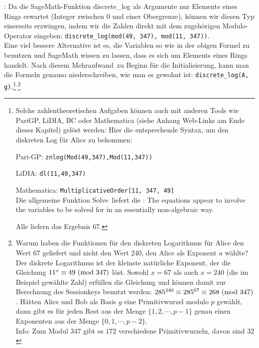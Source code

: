 \begin{refsegment}
\begin{remark}{:}
\noindent Da die SageMath-Funktion discrete\_log als Argumente nur
Elemente eines Rings erwartet (Integer zwischen 0 und einer Obergrenze),
können wir diesen Typ einerseits erzwingen, indem wir die Zahlen direkt mit dem
zugehörigen Modulo-Operator eingeben: \texttt{discrete\_log(mod(49, 347), mod(11, 347))}.\\
Eine viel bessere Alternative ist es, die Variablen so wie in der obigen Formel
zu benutzen und SageMath wissen zu lassen, dass es sich um Elements eines Rings handelt.
Nach diesem \glqq Mehraufwand\grqq~zu Beginn für die Initialisierung, kann man die Formeln
genauso niederschreiben, wie man es gewohnt ist: \texttt{discrete\_log(A, g)}.\footnote{%
Solche zahlentheoretischen Aufgaben können auch mit anderen Tools wie PariGP,
LiDIA, BC oder Mathematica
(siehe Anhang Web-Links am Ende dieses Kapitel) gelöst werden:
Hier die entsprechende Syntax, um den diskreten Log für Alice zu bekommen:
	\begin{compactitem}
	\item Pari-GP: \texttt{znlog(Mod(49,347),Mod(11,347))}
	\item LiDIA:   \texttt{dl(11,49,347)}
	\item Mathematica: {\tt MultiplicativeOrder[11, 347, 49]}\\
		Die allgemeine Funktion \glqq Solve\grqq~liefert die  \grqq:
		The equations appear to involve the variables to be solved
		for in an essentially non-algebraic way.
	\end{compactitem}
Alle liefern das Ergebnis $67$.
}${}^,$\footnote{%
Warum haben die Funktionen für den diskreten
Logarithmus für Alice
den Wert $67$ geliefert und nicht den Wert 240, den Alice als Exponent $a$ wählte?\\
Der diskrete Logarithmus ist der kleinste natürliche Exponent, der die
Gleichung $11^x \equiv 49{\rm ~(mod~}347)$ löst. Sowohl $x=67$ als auch $x=240$ (die im Beispiel
gewählte Zahl) erfüllen die Gleichung und können damit zur Berechnung des
Sessionkeys benutzt werden: $285^{240}  \equiv 285^{67} \equiv 268 {\rm ~(mod~}347)$.
Hätten Alice und Bob als Basis $g$ eine Primitivwurzel modulo $p$ gewählt,
dann gibt es für jeden Rest aus der Menge
$\{1, 2, \cdots, p-1\}$ genau einen Exponenten aus der Menge $\{0, 1, \cdots, p-2\}.$\\
\indent Info: Zum Modul $347$ gibt es $172$ verschiedene Primitivwurzeln, davon sind $32$
}
\end{remark}
\end{refsegment}
